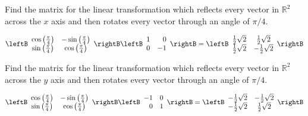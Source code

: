 \begin{enumialphparenastyle}
\begin{ex} Find the matrix for the linear transformation which reflects every
vector in $\mathbb{R}^{2}$ across the $x$ axis and then rotates every vector
through an angle of $\pi /4$.
\begin{sol}
\[
\leftB
\begin{array}{cc}
\cos \left( \frac{\pi }{4}\right)  & -\sin \left( \frac{\pi }{4}\right)  \\
\sin \left( \frac{\pi }{4}\right)  & \cos \left( \frac{\pi }{4}\right)
\end{array}
\rightB \leftB
\begin{array}{rr}
1 & 0 \\
0 & -1
\end{array}
\rightB = \leftB
\begin{array}{cc}
\frac{1}{2}\sqrt{2} & \frac{1}{2}\sqrt{2} \\
\frac{1}{2}\sqrt{2} & -\frac{1}{2}\sqrt{2}
\end{array}
\rightB
\]
\end{sol}
\end{ex}

\begin{ex} Find the matrix for the linear transformation which reflects every
vector in $\mathbb{R}^{2}$ across the $y$ axis and then rotates every vector
through an angle of $\pi /4$.
\begin{sol}
\[
\leftB
\begin{array}{cc}
\cos \left( \frac{\pi }{4}\right)  & -\sin \left( \frac{\pi }{4}\right)  \\
\sin \left( \frac{\pi }{4}\right)  & \cos \left( \frac{\pi }{4}\right)
\end{array}
\rightB \leftB
\begin{array}{rr}
-1 & 0 \\
0 & 1
\end{array}
\rightB = \leftB
\begin{array}{cc}
-\frac{1}{2}\sqrt{2} & -\frac{1}{2}\sqrt{2} \\
-\frac{1}{2}\sqrt{2} & \frac{1}{2}\sqrt{2}
\end{array}
\rightB
\]
\end{sol}
\end{ex}


\end{enumialphparenastyle}
